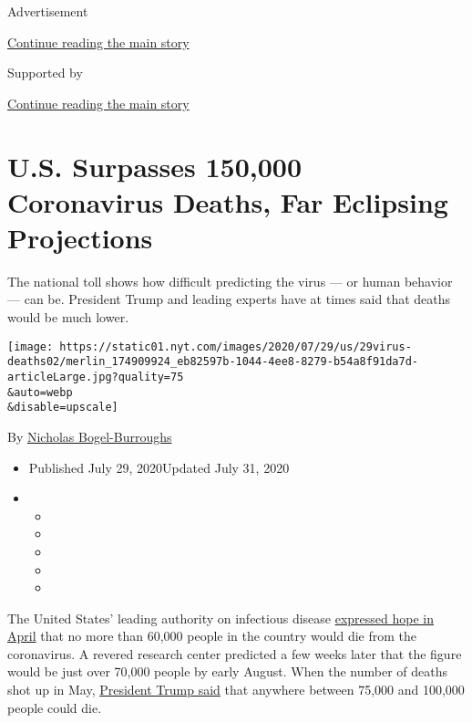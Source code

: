 Advertisement

\protect\hyperlink{after-top}{Continue reading the main story}

Supported by

\protect\hyperlink{after-sponsor}{Continue reading the main story}

\hypertarget{us-surpasses-150000-coronavirus-deaths-far-eclipsing-projections}{%
\section{U.S. Surpasses 150,000 Coronavirus Deaths, Far Eclipsing
Projections}\label{us-surpasses-150000-coronavirus-deaths-far-eclipsing-projections}}

The national toll shows how difficult predicting the virus --- or human
behavior --- can be. President Trump and leading experts have at times
said that deaths would be much lower.

\texttt{[image: https://static01.nyt.com/images/2020/07/29/us/29virus-deaths02/merlin\_174909924\_eb82597b-1044-4ee8-8279-b54a8f91da7d-articleLarge.jpg?quality=75\\\&auto=webp\\\&disable=upscale]}

By \href{https://www.nytimes.com/by/nicholas-bogel-burroughs}{Nicholas
Bogel-Burroughs}

\begin{itemize}
\item
  Published July 29, 2020Updated July 31, 2020
\item
  \begin{itemize}
  \item
  \item
  \item
  \item
  \item
  \end{itemize}
\end{itemize}

The United States' leading authority on infectious disease
\href{https://www.today.com/video/dr-anthony-fauci-virus-death-toll-may-be-more-like-60-000-than-100-000-to-200-000-81825861735}{expressed
hope in April} that no more than 60,000 people in the country would die
from the coronavirus. A revered research center predicted a few weeks
later that the figure would be just over 70,000 people by early August.
When the number of deaths shot up in May,
\href{https://www.nytimes.com/2020/05/03/us/politics/trump-coronavirus.html}{President
Trump said} that anywhere between 75,000 and 100,000 people could die.

